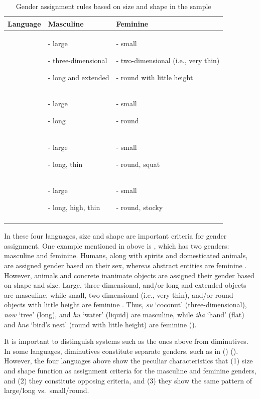 \documentclass[output=collectionpaper]{langsci/langscibook}
\begin{document}
\begin{table}
\begin{tabularx}{\textwidth}{lQQ}
\lsptoprule
 Language &  Masculine & Feminine\\\midrule
{} & {{}- large}

{{}- three-dimensional}

{}- long and extended & {{}- small}

{{}- two-dimensional (i.e., very thin)}

{}- round with little height\\
 & {{}- large}

{}- long & {{}- small}

{}- round\\
 & {{}- large}

{}- long, thin & {{}- small}

{}- round, squat\\
 & {{}- large}

{}- long, high, thin & {{}- small}

{}- round, stocky\\
\lspbottomrule
\end{tabularx}

\caption{Gender assignment rules based on size and shape in the sample}
\label{tab:Svard:13}
\end{table}


In these four languages, size and shape are important criteria for gender assignment. One example mentioned in  above is , which has two genders: masculine and feminine. Humans, along with spirits and domesticated animals, are assigned gender based on their sex, whereas abstract entities are feminine \citep[47]{Lock2011}. However, animals and concrete inanimate objects are assigned their gender based on shape and size. Large, three-dimensional, and/or long and extended objects are masculine, while small, two-dimensional (i.e., very thin), and/or round objects with little height are feminine \citep[47]{Lock2011}. Thus, \textit{su} `coconut' (three-dimensional), \textit{now} `tree' (long), and \textit{hu} `water' (liquid) are masculine, while \textit{iha} `hand' (flat) and \textit{hne} `bird's nest' (round with little height) are feminine (\citealt[48--50]{Lock2011}).



It is important to distinguish systems such as the ones above from diminutives. In some languages, diminutives constitute separate genders, such as in  () (\citealt[68--69]{Onishi1994}). However, the four languages above show the peculiar characteristics that (1) size and shape function as assignment criteria for the masculine and feminine genders, and (2) they constitute opposing criteria, and (3) they show the same pattern of large/long vs.\ small/round.
\end{document}
